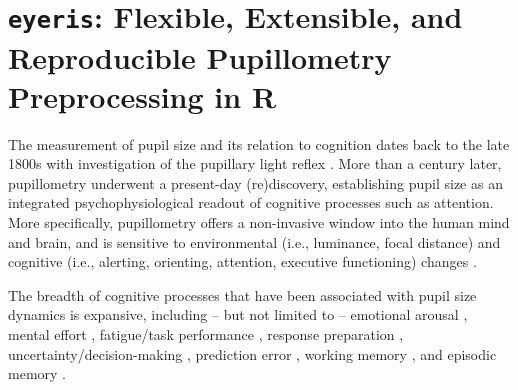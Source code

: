\chapter{\texttt{eyeris}: Flexible, Extensible, and Reproducible Pupillometry Preprocessing in R}

The measurement of pupil size and its relation to cognition dates back to the late 1800s with investigation of the pupillary light reflex \parencite{haab1886vortrag}. More than a century later, pupillometry underwent a present-day (re)discovery, establishing pupil size as an integrated psychophysiological readout of cognitive processes such as attention. More specifically, pupillometry offers a non-invasive window into the human mind and brain, and is sensitive to environmental (i.e., luminance, focal distance) and cognitive (i.e., alerting, orienting, attention, executive functioning) changes \parencite{huang2024locus,strauch2024forgotten,strauch2022pupillometry}.

The breadth of cognitive processes that have been associated with pupil size dynamics is expansive, including – but not limited to – emotional arousal \parencite{bradley2008pupil,oliva2018pupil}, mental effort \parencite{kahneman1966pupil,kramer2013processing}, fatigue/task performance \parencite{astonjones2005integrative,eldar2013effects,knapen2016cognitive,mcginley2015cortical,murphy2011pupillometry}, response preparation \parencite{einhauser2008pupil,reimer2014pupil}, uncertainty/decision-making \parencite{gee2014decision,jepma2011pupil,kawaguchi2018differentiating}, prediction error \parencite{alamia2019pupil}, working memory \parencite{keene2022pupillometry,robison2019pupillometry,unsworth2015individual,unsworth2017importance,unsworth2017locus}, and episodic memory \parencite{clewett2020pupil,madore2020memory,madore2022readiness,miller2019individual,miller2020variation,robison2022pupillary,schwartz2025attending}.

